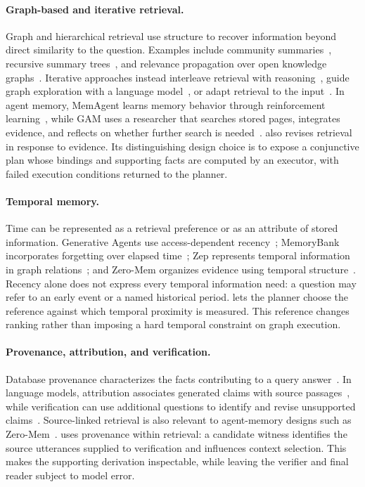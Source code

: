 \paragraph{Graph-based and iterative retrieval.}
Graph and hierarchical retrieval use structure to recover information
beyond direct similarity to the question. Examples include community
summaries~\cite{edge2024graphrag}, recursive summary
trees~\cite{sarthi2024raptor}, and relevance propagation over open
knowledge graphs~\cite{gutierrez2024hipporag,gutierrez2025hipporag2}.
Iterative approaches instead interleave retrieval with
reasoning~\cite{trivedi2023ircot}, guide graph exploration with a language
model~\cite{sun2024tog}, or adapt retrieval to the
input~\cite{asai2024selfrag,jeong2024adaptiverag}. In agent memory,
MemAgent learns memory behavior through reinforcement
learning~\cite{yu2026memagent}, while GAM uses a researcher that searches
stored pages, integrates evidence, and reflects on whether further
search is needed~\cite{yan2025gam}. \sys also revises retrieval in
response to evidence. Its distinguishing design choice is to expose a
conjunctive plan whose bindings and supporting facts are computed by
an executor, with failed execution conditions returned to the planner.

\paragraph{Temporal memory.}
Time can be represented as a retrieval preference or as an attribute of
stored information. Generative Agents use access-dependent
recency~\cite{park2023generative}; MemoryBank incorporates forgetting over
elapsed time~\cite{zhong2024memorybank}; Zep represents temporal
information in graph relations~\cite{rasmussen2025zep}; and Zero-Mem
organizes evidence using temporal structure~\cite{xiao2026zeromem}.
Recency alone does not express every temporal information need: a
question may refer to an early event or a named historical period.
\sys lets the planner choose the reference against which temporal
proximity is measured. This reference changes ranking rather than
imposing a hard temporal constraint on graph execution.

\paragraph{Provenance, attribution, and verification.}
Database provenance characterizes the facts contributing to a query
answer~\cite{buneman2001why,green2007provenance}. In language models,
attribution associates generated claims with source
passages~\cite{gao2023alce}, while verification can use additional
questions to identify and revise unsupported
claims~\cite{dhuliawala2024cove}. Source-linked retrieval is also relevant
to agent-memory designs such as Zero-Mem~\cite{xiao2026zeromem}.
\sys uses provenance within retrieval: a candidate witness identifies
the source utterances supplied to verification and influences context
selection. This makes the supporting derivation inspectable, while
leaving the verifier and final reader subject to model error.
